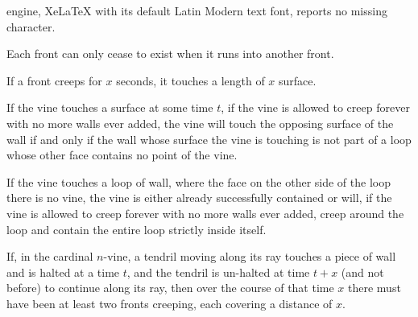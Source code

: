 \documentclass[10pt,a4paper]{amsart}
\begin{document}
engine, XeLaTeX with its default Latin Modern text font, reports no missing character.
\begin{lemma}
\label{lma:front-erasure}
Each front can only cease to exist when it runs into another front.
\end{lemma}

\begin{lemma}
\label{lma:creeping-wall}
If a front creeps for \(x\) seconds, it touches a length of \(x\) surface. 
\end{lemma}

\begin{lemma}
\label{lma:wall-surface-cont}
If the vine touches a surface at some time \(t\), if the vine is allowed to creep forever with no more walls ever added, the vine will touch the opposing surface of the wall if and only if the wall whose surface the vine is touching is not part of a loop whose other face contains no point of the vine. 
\end{lemma}

\begin{lemma}
\label{lma:loop-creeping}
If the vine touches a loop of wall, where the face on the other side of the loop there is no vine, the vine is either already successfully contained or will, if the vine is allowed to creep forever with no more walls ever added, creep around the loop and contain the entire loop strictly inside itself.
\end{lemma}

\begin{lemma}
\label{lma:wall-reqs-rays}
If, in the cardinal \(n\)-vine, a tendril moving along its ray touches a piece of wall and is halted at a time \(t\), and the tendril is un-halted at time \(t+x\) (and not before) to continue along its ray, then over the course of that time \(x\) there must have been at least two fronts creeping, each covering a distance of \(x\). 
\end{lemma}
\end{document}
